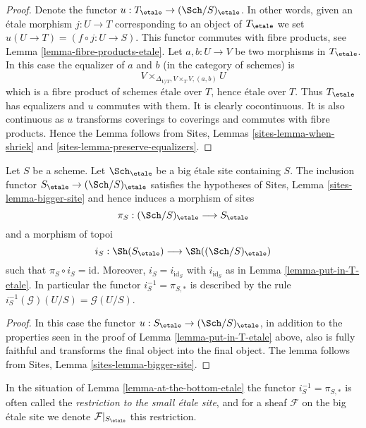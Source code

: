 \begin{proof}
Denote the functor $u : T_\etale \to (\Sch/S)_\etale$.
In other words, given an \'etale morphism $j : U \to T$ corresponding
to an object of $T_\etale$ we set $u(U \to T) = (f \circ j : U \to S)$.
This functor commutes with fibre products, see
Lemma \ref{lemma-fibre-products-etale}.
Let $a, b : U \to V$ be two morphisms in $T_\etale$.
In this case the equalizer of $a$ and $b$ (in the category of schemes) is
$$
V \times_{\Delta_{V/T}, V \times_T V, (a, b)} U
$$
which is a fibre product of schemes \'etale over $T$, hence \'etale
over $T$. Thus $T_\etale$ has equalizers and $u$ commutes with them.
It is clearly cocontinuous.
It is also continuous as $u$ transforms coverings to coverings and
commutes with fibre products. Hence the Lemma follows from
Sites, Lemmas \ref{sites-lemma-when-shriek}
and \ref{sites-lemma-preserve-equalizers}.
\end{proof}

\begin{lemma}
\label{lemma-at-the-bottom-etale}
Let $S$ be a scheme. Let $\Sch_\etale$ be a big \'etale
site containing $S$.
The inclusion functor $S_\etale \to (\Sch/S)_\etale$
satisfies the hypotheses of Sites, Lemma \ref{sites-lemma-bigger-site}
and hence induces a morphism of sites
$$
\pi_S : (\Sch/S)_\etale \longrightarrow S_\etale
$$
and a morphism of topoi
$$
i_S : \Sh(S_\etale) \longrightarrow \Sh((\Sch/S)_\etale)
$$
such that $\pi_S \circ i_S = \text{id}$. Moreover, $i_S = i_{\text{id}_S}$
with $i_{\text{id}_S}$ as in Lemma \ref{lemma-put-in-T-etale}.
In particular the functor $i_S^{-1} = \pi_{S, *}$ is described by the rule
$i_S^{-1}(\mathcal{G})(U/S) = \mathcal{G}(U/S)$.
\end{lemma}

\begin{proof}
In this case the functor
$u : S_\etale \to (\Sch/S)_\etale$,
in addition to the properties seen in the proof of
Lemma \ref{lemma-put-in-T-etale} above, also is fully faithful
and transforms the final object into the final object.
The lemma follows from Sites, Lemma \ref{sites-lemma-bigger-site}.
\end{proof}

\begin{definition}
\label{definition-restriction-small-etale}
In the situation of
Lemma \ref{lemma-at-the-bottom-etale}
the functor $i_S^{-1} = \pi_{S, *}$ is often
called the {\it restriction to the small \'etale site}, and for a sheaf
$\mathcal{F}$ on the big \'etale site we denote
$\mathcal{F}|_{S_\etale}$ this restriction.
\end{definition}

